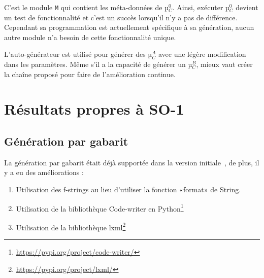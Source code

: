 C'est le module \texttt{M} qui contient les méta-données de µ$_C^0$. Ainsi, exécuter µ$_C^0$ devient un test de fonctionnalité et c'est un succès lorsqu'il n'y a pas de différence. Cependant sa programmation est actuellement spécifique à sa génération, aucun autre module n’a besoin de cette fonctionnalité unique.




L'auto-générateur est utilisé pour générer des µ$_C^A$ avec une légère modification dans les paramètres. Même s'il a la capacité de générer un µ$_C^B$, mieux vaut créer la chaîne proposé pour faire de l'amélioration continue.

\section{Résultats propres à SO-1}

\subsection{Génération par gabarit}

La génération par gabarit était déjà supportée dans la version initiale~\cite{bluiksnot_repo}, de plus, il y a eu des améliorations :
\begin{enumerate}
    \item Utilisation des f-strings au lieu d'utiliser la fonction «format» de String.
    \item Utilisation de la bibliothèque Code-writer en Python\footnote{\url{https://pypi.org/project/code-writer/}}
    \item Utilisation de la bibliothèque lxml\footnote{\url{https://pypi.org/project/lxml/}}
\end{enumerate}

